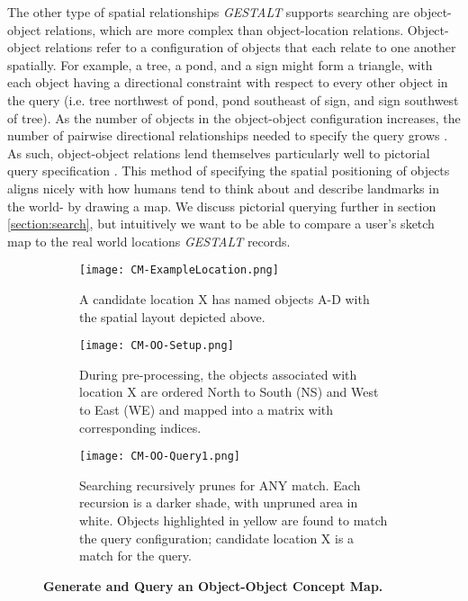 The other type of spatial relationships \emph{GESTALT} supports searching are object-object relations, which are more complex than object-location relations.
Object-object relations refer to a configuration of objects that each relate to one another spatially.
For example, a tree, a pond, and a sign might form a triangle, with each object having a directional constraint with respect to every other object in the query (i.e. tree northwest of pond, pond southeast of sign, and sign southwest of tree).
As the number of objects in the object-object configuration increases, the number of pairwise directional relationships needed to specify the query grows .
As such, object-object relations lend themselves particularly well to pictorial query specification .
This method of specifying the spatial positioning of objects aligns nicely with how humans tend to think about and describe landmarks in the world- by drawing a map. 
We discuss pictorial querying further in section \ref{section:search}, but intuitively we want to be able to compare a user's sketch map to the real world locations \emph{GESTALT} records. 








\begin{figure*}[h]
    \centering
    \begin{subfigure}[t]{.3\textwidth}
        \texttt{[image: CM-ExampleLocation.png]}
        \caption{\small A candidate location X has named objects A-D with the spatial layout depicted above.}
        \label{fig:CM-Example}
    \end{subfigure}
    \hfill
    \begin{subfigure}[t]{.3\textwidth}
        \texttt{[image: CM-OO-Setup.png]}
        \caption{\small During pre-processing, the objects associated with location X are ordered North to South (NS) and West to East (WE) and mapped into a matrix with corresponding indices.}
        \label{fig:CM-OO-Setup}
    \end{subfigure}
    \hfill
        \begin{subfigure}[t]{.3\textwidth}
        \texttt{[image: CM-OO-Query1.png]}
        \caption{\small Searching recursively prunes for ANY match. Each recursion is a darker shade, with unpruned area in white. Objects highlighted in yellow are found to match the query configuration; candidate location X is a match for the query.}
        \label{fig:CM-OO-Query}
    \hfill
    \end{subfigure}
    \caption{\textbf{Generate and Query an Object-Object Concept Map.}}\label{figure:ConceptMap} 
\end{figure*}


